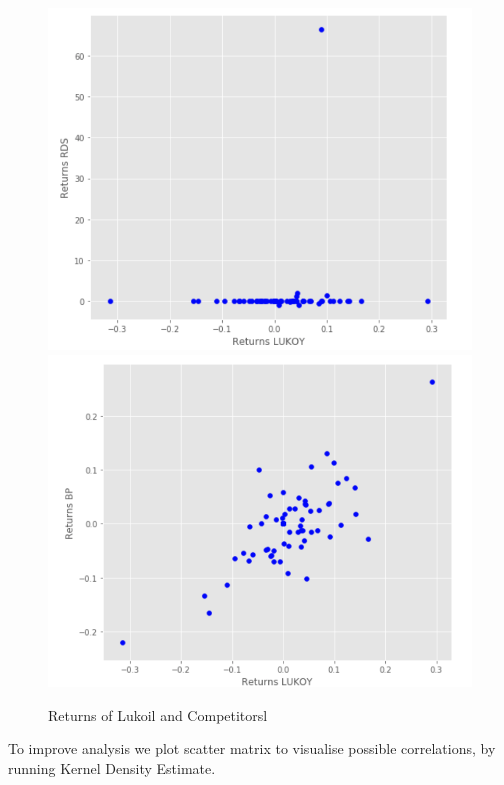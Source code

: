 \documentclass [a4paper, 11pt] {article}
\begin{document}
\begin{figure}[h]
\caption{Returns of Lukoil and Competitorsl}
\begin{center}
\includegraphics[scale=0.44]{Lukoil_RDS}
\includegraphics[scale=0.44]{Lukoil_BP}
\end{center}
\label{fig:scat1}
\end{figure}

To improve analysis we plot scatter matrix to visualise possible correlations, by running Kernel Density Estimate.
\end{document}
